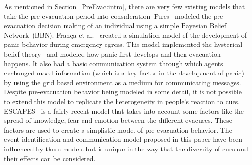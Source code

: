 As mentioned in Section~\ref{PreEvac:intro}, there are very few existing models that take the pre-evacuation period into consideration. Pires~\cite{Pires:2005gs}  modeled the pre-evacuation decision making of an individual using a simple Bayesian Belief Network~(BBN). Fran{\c c}a et al.~\cite{Franca:2009wq} created a simulation model of the development of panic behavior during emergency egress. This model implemented the hysterical belief theory~\cite{Torres:2010tj} and modeled how panic first develops and then evacuation happens. It also had a basic communication system through which agents exchanged mood information (which is a key factor in the development of panic) by using the grid based environment as a medium for communicating messages. Despite pre-evacuation behavior being modeled in some detail, it is not possible to extend this model to replicate the heterogeneity in people's reaction to cues. ESCAPES~\cite{Tsai:2011tz} is a fairly recent model that takes into account some factors like the spread of knowledge, fear and emotion between the different evacuees. These factors are used to create a simplistic model of pre-evacuation behavior. The event identification and communication model proposed in this paper have been influenced by these models but is unique in the way that the diversity of cues and their effects can be considered.






